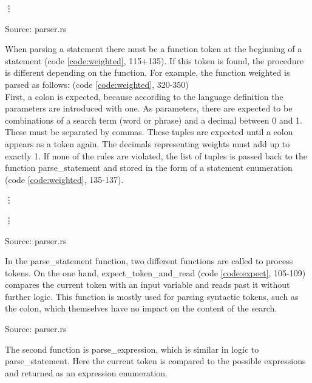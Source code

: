 \begin{codeenv}
    \label{code:read}
    
    \vdots
    
    \centerline{Source: parser.rs}
\end{codeenv}
When parsing a statement there must be a function token at the beginning of a statement (code \ref{code:weighted}, 115+135). If this token is found, the procedure is different depending on the function. For example, the function weighted is parsed as follows: (code \ref{code:weighted}, 320-350)\\
First, a colon is expected, because according to the language definition the parameters are introduced with one. As parameters, there are expected to be combinations of a search term (word or phrase) and a decimal between 0 and 1. These must be separated by commas. These tuples are expected until a colon appears as a token again. The decimals representing weights must add up to exactly 1. If none of the rules are violated, the list of tuples is passed back to the function parse\_statement and stored in the form of a statement enumeration (code \ref{code:weighted}, 135-137).
\begin{codeenv}
    \label{code:weighted}
    
    \vdots
    
    \vdots
    
    \centerline{Source: parser.rs}
\end{codeenv}
In the parse\_statement function, two different functions are called to process tokens. On the one hand, expect\_token\_and\_read (code \ref{code:expect}, 105-109) compares the current token with an input variable and reads past it without further logic. This function is mostly used for parsing syntactic tokens, such as the colon, which themselves have no impact on the content of the search.
\begin{codeenv}
    \label{code:expect}
    
    \centerline{Source: parser.rs}
\end{codeenv}
The second function is parse\_expression, which is similar in logic to parse\_statement. Here the current token is compared to the possible expressions and returned as an expression enumeration.
